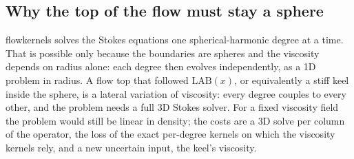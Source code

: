 \subsection{Why the top of the flow must stay a sphere}
flowkernels solves the Stokes equations one spherical-harmonic degree at a time.
That is possible only because the boundaries are spheres and the viscosity depends on radius alone: each degree then evolves independently, as a 1D problem in radius.
A flow top that followed $\mathrm{LAB}(x)$, or equivalently a stiff keel inside the sphere, is a lateral variation of viscosity: every degree couples to every other, and the problem needs a full 3D Stokes solver.
For a fixed viscosity field the problem would still be linear in density; the costs are a 3D solve per column of the operator, the loss of the exact per-degree kernels on which the viscosity kernels rely, and a new uncertain input, the keel's viscosity.

